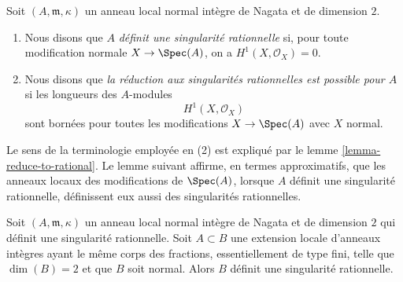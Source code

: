 \begin{definition} \label{definition-reduce-to-rational} Soit $(A, \mathfrak m, \kappa)$ un anneau local normal intègre de Nagata et de dimension $2$. \begin{enumerate} \item Nous disons que $A$ {\it définit une singularité rationnelle} si, pour toute modification normale $X \to \Spec(A)$, on a $H^1(X, \mathcal{O}_X) = 0$. \item Nous disons que {\it la réduction aux singularités rationnelles est possible pour $A$} si les longueurs des $A$-modules $$
H^1(X, \mathcal{O}_X)
$$ sont bornées pour toutes les modifications $X \to \Spec(A)$ avec $X$ normal. \end{enumerate} \end{definition}

\noindent Le sens de la terminologie employée en (2) est expliqué par le lemme \ref{lemma-reduce-to-rational}. Le lemme suivant affirme, en termes approximatifs, que les anneaux locaux des modifications de $\Spec(A)$, lorsque $A$ définit une singularité rationnelle, définissent eux aussi des singularités rationnelles.

\begin{lemma} \label{lemma-rational-propagates} Soit $(A, \mathfrak m, \kappa)$ un anneau local normal intègre de Nagata et de dimension $2$ qui définit une singularité rationnelle. Soit $A \subset B$ une extension locale d'anneaux intègres ayant le même corps des fractions, essentiellement de type fini, telle que $\dim(B) = 2$ et que $B$ soit normal. Alors $B$ définit une singularité rationnelle. \end{lemma}

